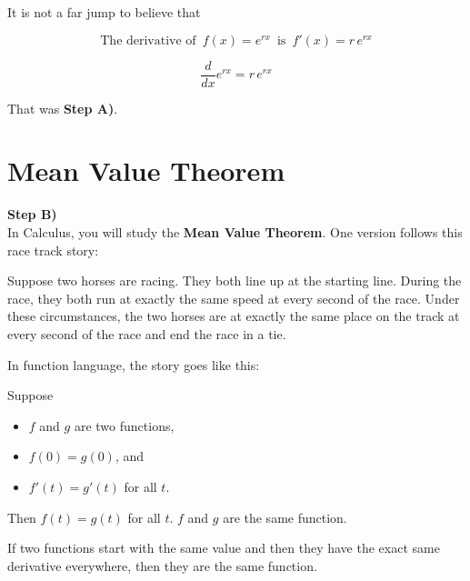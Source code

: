 \documentclass{ximera}
\begin{document}
It is not a far jump to believe that 




\begin{idea}

\[
\text{The derivative of } \, f(x) = e^{r x} \, \text{ is } \, f'(x) = r \, e^{r x}
\]


\[
\frac{d}{dx} e^{r x}  = r \, e^{r x}
\]

\end{idea}



That was \textbf{\textcolor{purple!85!blue}{Step A)}}. \\





\section{Mean Value Theorem}

\textbf{\textcolor{purple!85!blue}{Step B)}} \\

In Calculus, you will study the \textbf{Mean Value Theorem}. One version follows this race track story:


Suppose two horses are racing.  They both line up at the starting line.  During the race, they both run at exactly the same speed at every second of the race.  Under these circumstances, the two horses are at exactly the same place on the track at every second of the race and end the race in a tie.




In function language, the story goes like this:

Suppose 

\begin{itemize}
\item $f$ and $g$ are two functions,
\item $f(0) = g(0)$, and
\item $f'(t) = g'(t)$  for all $t$.
\end{itemize}

Then $f(t)=g(t)$ for all $t$.   $f$ and $g$ are the same function.



If two functions start with the same value and then they have the exact same derivative everywhere, then they are the same function. \\
\end{document}
